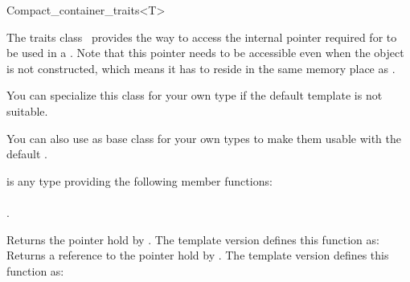 \begin{ccRefClass}{Compact_container_traits<T>}

  \ccDefinition The traits class \ccClassTemplateName\ provides
  the way to access the internal pointer required for  to be
  used in a .  Note that this
  pointer needs to be accessible even when the object is not constructed,
  which means it has to reside in the same memory place as .

  You can specialize this class for your own type 
  if the default template is not suitable.

  You can also use  as base class for your own
  types  to make them usable with the default \ccClassTemplateName.


  \ccTagFullDeclarations

  \ccParameters

   is any type providing the following member functions:\\
  \\
  .

  \ccOperations

  {Returns the pointer hold by .
   The template version defines this function as:\\
  }
  \ccGlue
  {Returns a reference to the pointer hold by .
   The template version defines this function as:\\
  }

\end{ccRefClass}

